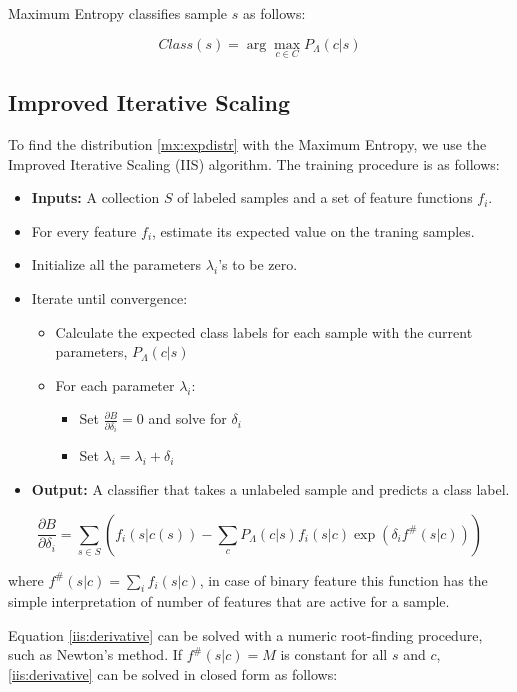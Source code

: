 \documentclass{report}
\begin{document}
Maximum Entropy classifies sample $s$ as follows:

\[
Class(s)  = \arg \max_{c \in C} P_{\Lambda}(c|s)
\]

\subsection{Improved Iterative Scaling}

To find the distribution \ref{mx:expdistr} with the Maximum Entropy, we use the Improved Iterative Scaling (IIS) \cite{berger:gental} algorithm. The training procedure is as follows:

\begin{itemize}
	\item \textbf{Inputs:} A collection $S$ of labeled samples and a set of feature functions $f_i$.
	\item For every feature $f_i$, estimate its expected value on the traning samples.
	\item Initialize all the parameters $\lambda_i$'s to be zero.
	\item Iterate until convergence:
	\begin{itemize}
		\item Calculate the expected class labels for each sample with the current parameters, $P_{\Lambda}(c|s)$
		\item For each parameter $\lambda_i$:
		\begin{itemize}
			\item Set $\frac{\partial B}{\partial \delta_i}  = 0$ and solve for $\delta_i$
			\item Set $\lambda_i = \lambda_i + \delta_i$
		\end{itemize}
	\end{itemize}
	\item \textbf{Output:} A classifier that takes a unlabeled sample and predicts a class label.
\end{itemize}

\begin{equation}
\label{iis:derivative}
\frac{\partial B}{\partial \delta_i} = \sum_{s \in S} (f_i (s|c(s)) - \sum_c P_{\Lambda}(c|s) f_i(s|c) \exp(\delta_i f^{\#}(s|c)))
\end{equation}

where $f^{\#}(s|c) = \sum_i f_i (s|c)$, in case of binary feature this function has the simple interpretation of number of features that are active for a sample.

Equation \ref{iis:derivative} can be solved with a numeric root-finding procedure, such as Newton’s method. If $f^{\#}(s|c) = M$ is constant for all $s$ and $c$, \ref{iis:derivative} can be solved in closed form as follows:
\end{document}
